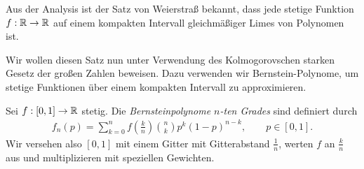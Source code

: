 \begin{bsp}
Aus der Analysis ist der Satz von Weierstraß bekannt, dass jede stetige
Funktion $f:\mathbb{R}\to \mathbb{R}$ auf einem kompakten Intervall gleichmäßiger Limes von
Polynomen ist.

Wir wollen diesen Satz nun unter Verwendung des
Kolmogorovschen starken Gesetz der großen Zahlen beweisen.
Dazu verwenden wir Bernstein-Polynome, um stetige Funktionen über einem
kompakten Intervall zu approximieren.

Sei $f: [0,1]\to\mathbb{R}$ stetig. Die \emph{Bernsteinpolynome $n$-ten Grades} sind
definiert durch
\begin{align*}
f_n(p) = \sum\limits_{k=0}^n
f\left(\frac{k}{n}\right)\binom{n}{k}p^k(1-p)^{n-k},\qquad p\in[0,1].
\end{align*}
Wir versehen also $[0,1]$ mit einem Gitter mit Gitterabstand $\frac{1}{n}$,
werten $f$ an $\frac{k}{n}$ aus und multiplizieren mit speziellen Gewichten.


\end{bsp}
